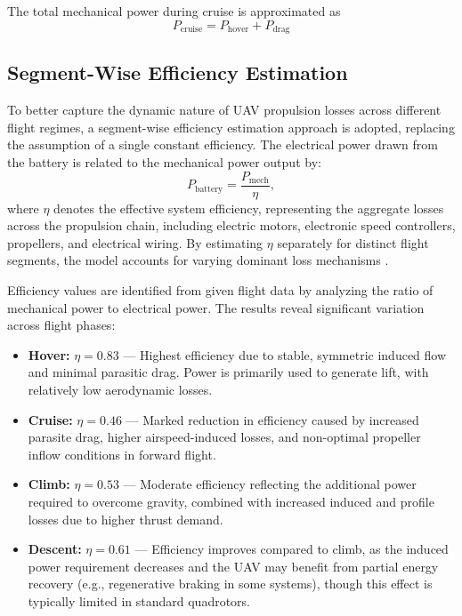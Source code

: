 The total mechanical power during cruise is approximated as
\begin{equation}
P_{\text{cruise}} = P_{\text{hover}} + P_{\text{drag}}
\end{equation}

\subsection{Segment-Wise Efficiency Estimation}

To better capture the dynamic nature of UAV propulsion losses across different flight regimes, a segment-wise efficiency estimation approach is adopted, replacing the assumption of a single constant efficiency. The electrical power drawn from the battery is related to the mechanical power output by:
\begin{equation}
P_{\text{battery}} = \frac{P_{\text{mech}}}{\eta},
\end{equation}
where $\eta$ denotes the effective system efficiency, representing the aggregate losses across the propulsion chain, including electric motors, electronic speed controllers, propellers, and electrical wiring. By estimating $\eta$ separately for distinct flight segments, the model accounts for varying dominant loss mechanisms \cite{jacewicz2022}.

Efficiency values are identified from given flight data by analyzing the ratio of mechanical power to electrical power. The results reveal significant variation across flight phases:

\begin{itemize}
    \item \textbf{Hover:} $\eta = 0.83$ — Highest efficiency due to stable, symmetric induced flow and minimal parasitic drag. Power is primarily used to generate lift, with relatively low aerodynamic losses.
    
    \item \textbf{Cruise:} $\eta = 0.46$ — Marked reduction in efficiency caused by increased parasite drag, higher airspeed-induced losses, and non-optimal propeller inflow conditions in forward flight.
    
    \item \textbf{Climb:} $\eta = 0.53$ — Moderate efficiency reflecting the additional power required to overcome gravity, combined with increased induced and profile losses due to higher thrust demand.
    
    \item \textbf{Descent:} $\eta = 0.61$ — Efficiency improves compared to climb, as the induced power requirement decreases and the UAV may benefit from partial energy recovery (e.g., regenerative braking in some systems), though this effect is typically limited in standard quadrotors.
\end{itemize}

